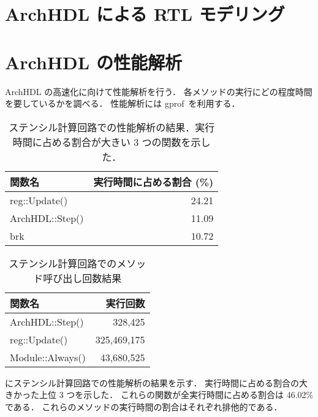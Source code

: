\section{ArchHDL による RTL モデリング \label{ss:modeling}}




\section{ArchHDL の性能解析 \label{ss:profiling}}

ArchHDL の高速化に向けて性能解析を行う．
各メソッドの実行にどの程度時間を要しているかを調べる．
性能解析には gprof~\cite{gprof}を利用する．

\begin{table}[t]
 \caption{ステンシル計算回路での性能解析の結果．実行時間に占める割合が大きい 3 つの関数を示した．}
 \label{table:stencil_prof}
 \begin{center}
  \begin{tabular}{l|r} \hline
  関数名 & 実行時間に占める割合 (\%) \\ \hline
  reg::Update() & 24.21 \\
  ArchHDL::Step() & 11.09 \\
  brk & 10.72 \\ \hline
  \end{tabular}
 \end{center}
\end{table}

\begin{table}[t]
 \caption{ステンシル計算回路でのメソッド呼び出し回数結果}
 \label{table:stencil_method_call_count}
 \begin{center}
  \begin{tabular}{l|r} \hline
  関数名 & 実行回数 \\ \hline
  ArchHDL::Step()   &     328,425 \\
  reg::Update()     & 325,469,175 \\
  Module::Always()  &  43,680,525 \\ \hline
  \end{tabular}
 \end{center}
\end{table}

 にステンシル計算回路での性能解析の結果を示す．
実行時間に占める割合の大きかった上位 3 つを示した．
これらの関数が全実行時間に占める割合は 46.02\% である．
これらのメソッドの実行時間の割合はそれぞれ排他的である．

